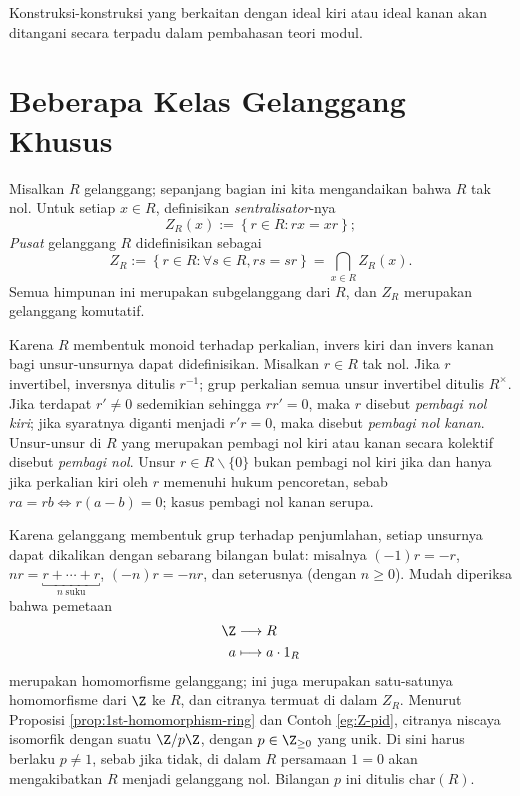 Konstruksi-konstruksi yang berkaitan dengan ideal kiri atau ideal kanan akan ditangani secara terpadu dalam pembahasan teori modul.

\section{Beberapa Kelas Gelanggang Khusus}
Misalkan $R$ gelanggang; sepanjang bagian ini kita mengandaikan bahwa $R$ tak nol. Untuk setiap $x \in R$, definisikan \emph{sentralisator}-nya
\[ Z_R(x) := \left\{ r \in R : rx=xr \right\}; \]
\emph{Pusat} gelanggang $R$ didefinisikan sebagai
\[ Z_R := \left\{r \in R : \forall s \in R, rs=sr \right\} = \bigcap_{x \in R} Z_R(x). \]
Semua himpunan ini merupakan subgelanggang dari $R$, dan $Z_R$ merupakan gelanggang komutatif.

Karena $R$ membentuk monoid terhadap perkalian, invers kiri dan invers kanan bagi unsur-unsurnya dapat didefinisikan. Misalkan $r \in R$ tak nol. Jika $r$ invertibel, inversnya ditulis $r^{-1}$; grup perkalian semua unsur invertibel ditulis $R^\times$. Jika terdapat $r' \neq 0$ sedemikian sehingga $rr'=0$, maka $r$ disebut \emph{pembagi nol kiri}; jika syaratnya diganti menjadi $r'r=0$, maka disebut \emph{pembagi nol kanan}. Unsur-unsur di $R$ yang merupakan pembagi nol kiri atau kanan secara kolektif disebut \emph{pembagi nol}. Unsur $r \in R \smallsetminus \{0\}$ bukan pembagi nol kiri jika dan hanya jika perkalian kiri oleh $r$ memenuhi hukum pencoretan, sebab $ra=rb \iff r(a-b)=0$; kasus pembagi nol kanan serupa.

Karena gelanggang membentuk grup terhadap penjumlahan, setiap unsurnya dapat dikalikan dengan sebarang bilangan bulat: misalnya $(-1)r = -r$, $nr = \underbracket{r + \cdots + r}_{n\; \text{suku}}$, $(-n)r = -nr$, dan seterusnya (dengan $n \geq 0$). Mudah diperiksa bahwa pemetaan
\begin{equation}\label{eqn:ring-struct-morphism}\begin{aligned}
	\Z & \longrightarrow R \\
	a & \longmapsto a \cdot 1_R
\end{aligned}\end{equation}
merupakan homomorfisme gelanggang; ini juga merupakan satu-satunya homomorfisme dari $\Z$ ke $R$, dan citranya termuat di dalam $Z_R$. Menurut Proposisi \ref{prop:1st-homomorphism-ring} dan Contoh \ref{eg:Z-pid}, citranya niscaya isomorfik dengan suatu $\Z/p\Z$, dengan $p \in \Z_{\geq 0}$ yang unik. Di sini harus berlaku $p \neq 1$, sebab jika tidak, di dalam $R$ persamaan $1=0$ akan mengakibatkan $R$ menjadi gelanggang nol. Bilangan $p$ ini ditulis $\text{char}(R)$.

